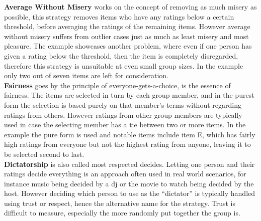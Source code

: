 \textbf{Average Without Misery} works on the concept of removing as much misery as possible, this strategy removes items who have any ratings below a certain threshold, before averaging the ratings of the remaining items. However average without misery suffers from outlier cases just as much as least misery and most pleasure. The example showcases another problem, where even if one person has given a rating below the threshold, then the item is completely disregarded, therefore this strategy is unsuitable at even small group sizes. In the example only two out of seven items are left for consideration.\\

\textbf{Fairness} goes by the principle of everyone-gets-a-choice, is the essence of fairness. The items are selected in turn by each group member, and in the purest form the selection is based purely on that member's terms without regarding ratings from others. However ratings from other group members are typically used in case the selecting member has a tie between two or more items. In the example the pure form is used and notable items include item E, which has fairly high ratings from everyone but not the highest rating from anyone, leaving it to be selected second to last.\\

\textbf{Dictatorship} is also called most respected decides. Letting one person and their ratings decide everything is an approach often used in real world scenarios, for instance music being decided by a dj or the movie to watch being decided by the host. However deciding which person to use as the “dictator” is typically handled using trust or respect, hence the alternative name for the strategy. Trust is difficult to measure, especially the more randomly put together the group is.

